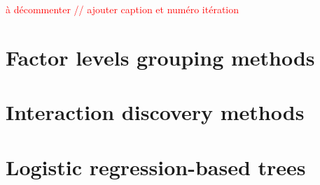 
\textcolor{red}{à décommenter // ajouter caption  et numéro itération}


\section{Factor levels grouping methods}


\section{Interaction discovery methods}


\section{Logistic regression-based trees}


\printbibliography[heading=subbibliography, title=References of Appendix A]